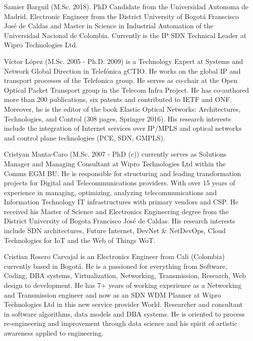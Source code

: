 \documentclass[a4paper,fleqn]{cas-dc}
\begin{document}
%
%






Samier Barguil (M.Sc. 2018). PhD Candidate from the Universidad Autonoma de Madrid. Electronic Engineer from the District University of Bogot\'a Franscisco Jos\'e de Caldas and Master in Science in Industrial Automation of the Universidad Nacional de Colombia. Currently is the IP SDN Technical Leader at Wipro Technologies Ltd. 
\endbio

Víctor López (M.Sc. 2005 - Ph.D. 2009) is a Technology Expert at Systems and Network Global Direction in Telefónica gCTIO. He works on the global IP and transport processes of the Telefonica group. He serves as co-chair at the Open Optical Packet Transport group in the Telecom Infra Project. He has co-authored more than 200 publications, six patents and contributed to IETF and ONF. Moreover, he is the editor of the book Elastic Optical Networks: Architectures, Technologies, and Control (308 pages, Springer 2016). His research interests include the integration of Internet services over IP/MPLS and optical networks and control plane technologies (PCE, SDN, GMPLS).
\endbio

Cristyan Manta-Caro (M.Sc. 2007 - PhD (c)) currently serves as Solutions Manager and Managing Consultant at Wipro Technologies Ltd within the Comms EGM BU. He is responsible for structuring and leading transformation projects for Digital and Telecommunications providers. With over 15 years of experience in managing, optimizing, analyzing telecommunications and Information Technology IT infrastructures with primary vendors and CSP. He received his Master of Science and Electronics Engineering degree from the District University of Bogota Francisco Jos\'e de Caldas. His research interests include SDN architectures, Future Internet, DevNet \& NetDevOps, Cloud Technologies for IoT and the Web of Things WoT.
\endbio

Cristian Rosero Carvajal is an Electronics Engineer from Cali (Colombia) currently based in Bogotá. He is a passioned for everything from Software, Coding, DBA systems, Virtualization, Networking, Transmission, Research, Web design to development. He has 7+ years of working experience as a Networking and Transmission engineer and now as an SDN WDM Planner at Wipro Technologies Ltd in this new service provider World. Researcher and consultant in software algorithms, data models and DBA systems. He is oriented to process re-engineering and improvement through data science and his spirit of artistic awareness applied to engineering.
\endbio
\end{document}
